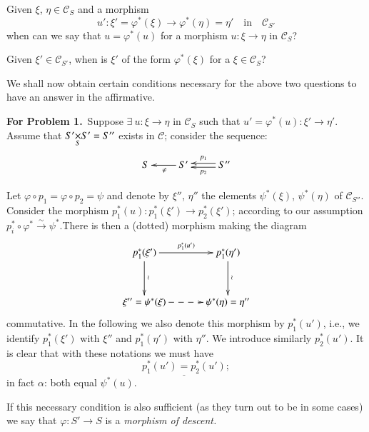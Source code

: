 \setcounter{problem}{0}
\begin{problem}
Given $\xi$, $\eta\in \mathscr{C}_{S}$ and a morphism
$$
u':\xi'=\varphi^{\ast}(\xi)\to
\varphi^{\ast}(\eta)=\eta'\quad\text{in}\quad \mathscr{C}_{S'} 
$$
when can we say that $u=\varphi^{\ast}(u)$ for a morphism $u:\xi\to
\eta$ in $\mathscr{C}_{S}$?
\end{problem}

\begin{problem}
Given $\xi'\in\mathscr{C}_{S'}$, when is $\xi'$ of the form
$\varphi^{\ast}(\xi)$ for a $\xi\in\mathscr{C}_{S}$?
\end{problem}

We shall now obtain certain conditions necessary for the above two
questions to have an answer in the affirmative.

\medskip
\noindent
{\bf For Problem 1.}~Suppose $\exists\ u:\xi\to \eta$ in
$\mathscr{C}_{S}$ such that $u'=\varphi^{\ast}(u):\xi'\to
\eta'$. Assume that $\fprod{S'}{S'}{S}=S''$ exists in $\mathscr{C}$;
consider the sequence:
\[
\xymatrix{
S & \ar[l]^{\varphi} S' & \ar@<-.2em>[l]_-{p_{1}}\ar@<.2em>[l]^-{p_{2}}  S''
}
\]

Let $\varphi\circ p_{1}=\varphi\circ p_{2}=\psi$ and denote by
$\xi''$, $\eta''$ the elements $\psi^{\ast}(\xi)$, $\psi^{\ast}(\eta)$
of $\mathscr{C}_{S''}$. Consider the morphism
$p^{\ast}_{1}(u):p^{\ast}_{1}(\xi')\to p^{\ast}_{2}(\xi')$; according
to our assumption $p^{\ast}_{i}\circ
\varphi^{\ast}\xrightarrow{\sim}\psi^{\ast}$.\pageoriginale There is
then a (dotted) morphism making the diagram
\[
\xymatrix@=1.2cm{
p^{\ast}_{1}(\xi')\ar[r]^{p^{\ast}_{1}(u')}\ar[d]^{\wr} &
p^{\ast}_{1}(\eta')\ar[d]^{\wr}\\ 
\xi''=\psi^{\ast}(\xi)\ar@{-->}[r] & \psi^{\ast}(\eta)=\eta''
}
\] 
commutative. In the following we also denote this morphism by
$p^{\ast}_{1}(u')$, i.e., we identify $p^{\ast}_{1}(\xi')$ with
$\xi''$ and $p^{\ast}_{1}(\eta')$ with $\eta''$. We introduce
similarly $p^{\ast}_{2}(u')$. It is clear that with these notations we
must have $$
\underline{p^{\ast}_{1}(u')=p^{\ast}_{2}(u')};
$$ 
in fact
$\alpha$: both equal $\psi^{\ast}(u)$. 

If this necessary condition is also sufficient (as they turn out to be
in some cases) we say that $\varphi:S'\to S$ is a {\em morphism of
  descent.}

